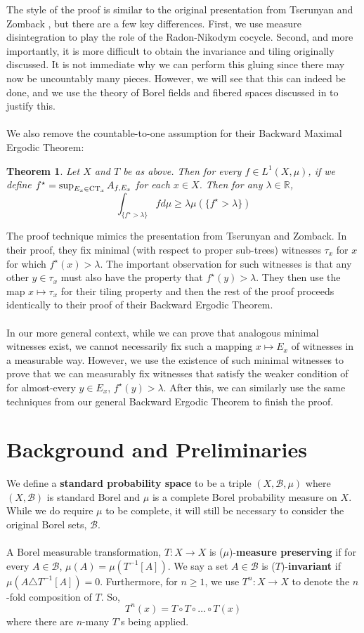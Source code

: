 \documentclass{article}
\newcommand{\CT}{\textmd{CT}}
\newtheorem{theorem}{Theorem}[section]
\theoremstyle{definition}
\begin{document}
\noindent The style of the proof is similar to the original presentation from Tserunyan and Zomback \cite{anushpaper}, but there are a few key differences. First, we use measure disintegration to play the role of the Radon-Nikodym cocycle. Second, and more importantly, it is more difficult to obtain the invariance and tiling originally discussed. It is not immediate why we can perform this gluing since there may now be uncountably many pieces. However, we will see that this can indeed be done, and we use the theory of Borel fields and fibered spaces discussed in \cite{borelfieldpaper} to justify this.\\\\
We also remove the countable-to-one assumption for their Backward Maximal Ergodic Theorem:
\begin{theorem}
    Let $ X $ and $ T $ be as above. Then for every $ f\in L^1(X,\mu) $, if we define $ f^\star  = \sup_{E_x\in \CT_x} A_{f,E_x} $ for each $ x\in X $. Then for any $ \lambda\in \mathbb{R} $, 
    \[
    \int_{\{f^\star>\lambda\}} f d\mu \geq \lambda \mu(\{f^\star>\lambda\})
    \]
\end{theorem}
\noindent The proof technique mimics the presentation from Tserunyan and Zomback. In their proof, they fix minimal (with respect to proper sub-trees) witnesses $ \tau_x $ for $ x $ for which $ f^\star(x)>\lambda $. The important observation for such witnesses is that any other $ y\in \tau_x $ must also have the property that $ f^\star(y)>\lambda $. They then use the map $ x\mapsto \tau_x $ for their tiling property and then the rest of the proof proceeds identically to their proof of their Backward Ergodic Theorem. \\\\
In our more general context, while we can prove that analogous minimal witnesses exist, we cannot necessarily fix such a mapping $ x\mapsto E_x $ of witnesses in a measurable way. However, we use the existence of such minimal witnesses to prove that we can measurably fix witnesses that satisfy the weaker condition of for almost-every $ y\in E_x $, $ f^\star(y)>\lambda $. After this, we can similarly use the same techniques from our general Backward Ergodic Theorem to finish the proof.

\section{Background and Preliminaries}
\noindent We define a \textbf{standard probability space} to be a triple $ (X,\mathcal{B},\mu) $ where $ (X,\mathcal{B}) $ is standard Borel and $ \mu $ is a complete Borel probability measure on $ X $. While we do require $ \mu $ to be complete, it will still be necessary to consider the original Borel sets, $ \mathcal{B} $. \\\\
A Borel measurable transformation, $ T:X\rightarrow X $ is ($\mu$)-\textbf{measure preserving} if for every $ A\in \mathcal{B} $, $ \mu(A) = \mu(T^{-1}[A]) $. We say a set $ A\in \mathcal{B} $ is ($T$)-\textbf{invariant} if $ \mu(A\triangle T^{-1}[A]) = 0 $. Furthermore, for $ n\geq 1 $, we use $ T^n:X\rightarrow X $ to denote the $ n $-fold composition of $ T $. So,
\[
T^n(x) = T\circ T\circ\ldots \circ T(x)
\]
where there are $ n $-many $ T $'s being applied.
\end{document}
